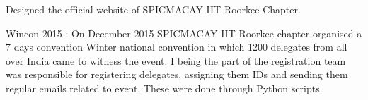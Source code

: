 \documentclass[]{deedy-resume-openfont}
\begin{document}
\begin{tightemize}
\item{Designed the official website of SPICMACAY IIT Roorkee Chapter.}
\item{Wincon 2015 : On December 2015 SPICMACAY IIT Roorkee chapter organised a 7 days convention Winter
national convention in which 1200 delegates from all over India came to witness the event. I being the part of the registration team was responsible for registering delegates, assigning them IDs and sending them regular emails related to event. These were done through Python scripts.}
\end{tightemize}
\sectionsep
\end{document}

